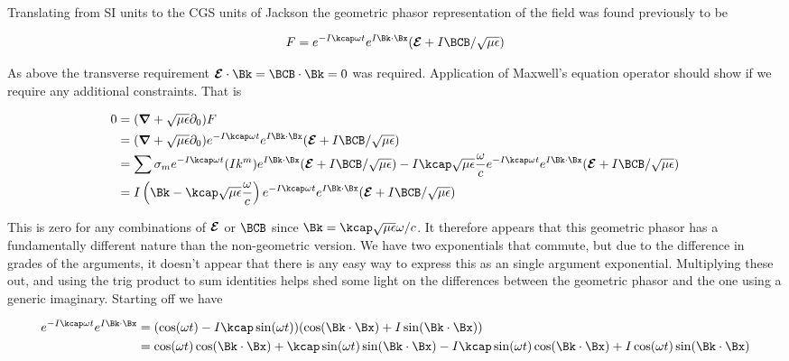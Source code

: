 Translating from SI units to the CGS units of Jackson the geometric phasor representation of the field was found previously to be

\begin{align}\label{eqn:fooE}
F = e^{ -I \kcap \omega t } e^{ I \Bk \cdot \Bx } (\EE + I\BCB/\sqrt{\mu\epsilon})
\end{align}

As above the transverse requirement $\EE \cdot \Bk = \BCB \cdot \Bk = 0$ was required.  Application of Maxwell's equation operator should show if we require any additional constraints.  That is

\begin{align*}
0 
&= (\spacegrad + \sqrt{\mu\epsilon}\partial_0) F \\
&=
(\spacegrad + \sqrt{\mu\epsilon}\partial_0) e^{ -I \kcap \omega t } e^{ I \Bk \cdot \Bx } (\EE + I\BCB/\sqrt{\mu\epsilon}) \\
&=
\sum \sigma_m e^{ -I \kcap \omega t } (I k^m) e^{ I \Bk \cdot \Bx } (\EE + I\BCB/\sqrt{\mu\epsilon}) 
-I \kcap \sqrt{\mu\epsilon} \frac{\omega}{c} e^{ -I \kcap \omega t } e^{ I \Bk \cdot \Bx } (\EE + I\BCB/\sqrt{\mu\epsilon}) \\
&=
I \left(\Bk - \kcap \sqrt{\mu\epsilon} \frac{\omega}{c} \right) e^{ -I \kcap \omega t } e^{ I \Bk \cdot \Bx } (\EE + I\BCB/\sqrt{\mu\epsilon}) 
\end{align*}

This is zero for any combinations of $\boldsymbol{\mathcal{E}}$ or $\BCB$ since $\Bk = \kcap \sqrt{\mu\epsilon} \omega/c$.  It therefore appears that this geometric phasor has a fundamentally different nature than the non-geometric version.  We have two exponentials that commute, but due to the difference in grades of the arguments, it doesn't appear that there is any easy way to express this as an single argument exponential.  Multiplying these out, and using the trig product to sum identities helps shed some light on the differences between the geometric phasor and the one using a generic imaginary.  Starting off we have

\begin{align*}
e^{ -I \kcap \omega t } e^{ I \Bk \cdot \Bx }
&=
(\cos(\omega t) -I\kcap \sin(\omega t)) (\cos(\Bk \cdot \Bx) +I\sin(\Bk \cdot \Bx)) \\
&=
\cos(\omega t)\cos(\Bk \cdot \Bx) 
+ \kcap \sin(\omega t)\sin(\Bk \cdot \Bx)
-I\kcap \sin(\omega t)\cos(\Bk \cdot \Bx)
+I \cos(\omega t) \sin(\Bk \cdot \Bx) \\
\end{align*}

